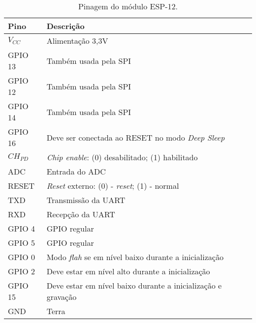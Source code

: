\begin{table}[H]
    \centering
    \caption[Pinagem do módulo ESP-12]{Pinagem do módulo ESP-12.
    \label{tab:pinoutesp}}
\begin{tabular}{|l|l|}
\hline
\textbf{Pino} & \textbf{Descrição} \\ \hline
$V_{CC}$ & Alimentação 3,3V \\ \hline
GPIO 13 & Também usada pela SPI \\ \hline
GPIO 12 & Também usada pela SPI \\ \hline
GPIO 14 & Também usada pela SPI \\ \hline
GPIO 16 & Deve ser conectada ao RESET no modo \emph{Deep Sleep} \\ \hline
$CH_{PD}$ & \emph{Chip enable}: (0) desabilitado; (1) habilitado \\ \hline
ADC & Entrada do ADC \\ \hline
RESET & \emph{Reset} externo: (0) - \emph{reset}; (1) - normal \\ \hline
TXD & Transmissão da UART \\ \hline
RXD & Recepção da UART \\ \hline
GPIO 4 & GPIO regular \\ \hline
GPIO 5 & GPIO regular \\ \hline
GPIO 0 & Modo \emph{flah} se em nível baixo durante a inicialização \\ \hline
GPIO 2 & Deve estar em nível alto durante a inicialização \\ \hline
GPIO 15 & Deve estar em nível baixo durante a inicialização e gravação \\ \hline
GND & Terra \\ \hline
\end{tabular}
\end{table}
